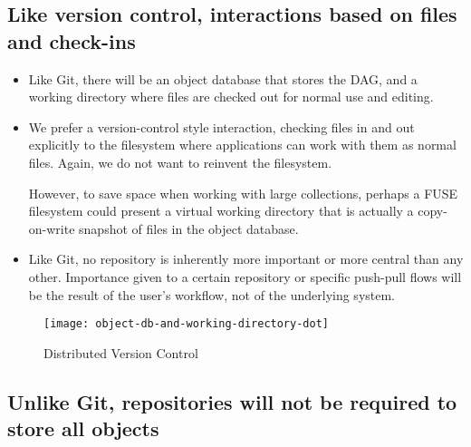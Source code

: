 \documentclass[a4paper]{article}
\begin{document}
\subsection{Like version control, interactions based on files and
check-ins}\label{like-version-control-interactions-based-on-files-and-check-ins}

\begin{itemize}
\item
  Like Git, there will be an object database that stores the DAG, and a
  working directory where files are checked out for normal use and
  editing.
\item
  We prefer a version-control style interaction, checking files in and
  out explicitly to the filesystem where applications can work with them
  as normal files. Again, we do not want to reinvent the filesystem.

  However, to save space when working with large collections, perhaps a FUSE
  filesystem could present a virtual working directory that is actually a
  copy-on-write snapshot of files in the object database.
\item
  Like Git, no repository is inherently more important or more central than any
  other. Importance given to a certain repository or specific push-pull flows
  will be the result of the user's workflow, not of the underlying system.
\end{itemize}


\begin{figure}[h!]
  \caption{Distributed Version Control}
  \label{fig:object-db-and-working-directory}
  \centering
    \texttt{[image: object-db-and-working-directory-dot]}
\end{figure}



\subsection{Unlike Git, repositories will not be required to store
all
objects}\label{unlike-git-repositories-will-not-be-required-to-store-all-objects}
\end{document}

